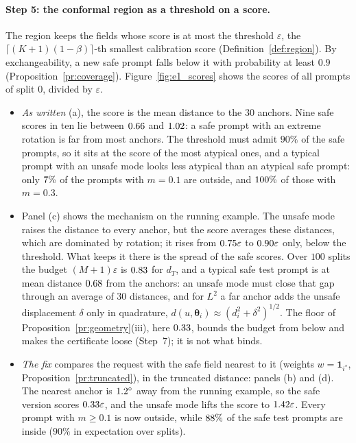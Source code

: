 \documentclass{article}
\newcommand{\bth}{\boldsymbol{\theta}}
\theoremstyle{plain}
\theoremstyle{remark}
\begin{document}
\paragraph{Step 5: the conformal region as a threshold on a score.}
The region keeps the fields whose score is at most the threshold $\varepsilon$, the $\lceil(K+1)(1-\beta)\rceil$-th smallest calibration
score (Definition~\ref{def:region}). By exchangeability, a new safe prompt falls below it with probability at least $0.9$
(Proposition~\ref{pr:coverage}). Figure~\ref{fig:e1_scores} shows the scores of all prompts of split $0$, divided by $\varepsilon$.
\begin{itemize}
\item \emph{As written} (a), the score is the mean distance to the $30$ anchors. Nine safe scores in ten lie between $0.66$ and $1.02$: a safe prompt with an extreme rotation is far from
most anchors. The threshold must admit $90\%$ of the safe prompts, so it
sits at the score of the most atypical ones, and a typical prompt with an unsafe mode looks less atypical than an
atypical safe prompt: only $7\%$ of the prompts with $m=0.1$ are outside, and $100\%$ of those with $m=0.3$.
\item Panel (c) shows the mechanism on the running example. The unsafe mode raises the distance to every anchor,
but the score averages these distances, which are dominated by rotation; it rises from $0.75\varepsilon$ to $0.90\varepsilon$ only,
below the threshold. What keeps it there is the spread of the safe scores. Over $100$ splits the budget $(M+1)\varepsilon$ is
$0.83$ for $d_T$, and a typical safe test prompt is at mean distance $0.68$ from the anchors: an unsafe mode must
close that gap through an average of $30$ distances, and for $L^2$ a far anchor adds the unsafe displacement $\delta$ only in
quadrature, $d(u,\bth_i)\approx(d_i^2+\delta^2)^{1/2}$. The floor of Proposition~\ref{pr:geometry}(iii), here $0.33$, bounds the
budget from below and makes the certificate loose (Step~7); it is not what binds.
\item \emph{The fix} compares the request with the safe field nearest to it (weights $w=\mathbf 1_{i^\star}$,
Proposition~\ref{pr:truncated}), in the truncated distance: panels (b) and (d). The nearest anchor is $1.2^\circ$ away from the
running example, so the safe version scores $0.33\varepsilon$, and the unsafe mode lifts the score to $1.42\varepsilon$. Every prompt
with $m\ge0.1$ is now outside, while $88\%$ of the safe test prompts are inside ($90\%$ in expectation over splits).
\end{itemize}
\end{document}

